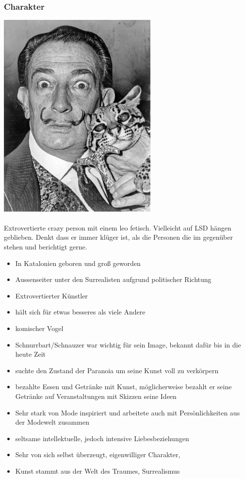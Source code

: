 \documentclass[12pt, a4paper, openany]{report}
\begin{document}
\subsubsection{Charakter}
\includegraphics[width=8cm]{Salvador-Dali.jpg}\\\\
Extrovertierte crazy person mit einem leo fetisch.  Vielleicht auf LSD hängen geblieben. Denkt dass er immer klüger ist, als die Personen die im gegenüber stehen und berichtigt gerne.

\begin{itemize}
\item In Katalonien geboren und groß geworden
\item Aussenseiter unter den Surrealisten aufgrund politischer Richtung
\item Extrovertierter Künstler
\item hält sich für etwas besseres als viele Andere
\item komischer Vogel
\item Schnurrbart/Schnauzer war wichtig für sein Image, bekannt dafür bis in die heute Zeit
\item suchte den Zustand der Paranoia um seine Kunst voll zu verkörpern
\item bezahlte Essen und Getränke mit Kunst, möglicherweise bezahlt er seine Getränke auf Veranstaltungen mit Skizzen seine Ideen
\item Sehr stark von Mode inspiriert und arbeitete auch mit Persönlichkeiten aus der Modewelt zusammen
\item seltsame intellektuelle, jedoch intensive Liebesbeziehungen 
\item Sehr von sich selbst überzeugt, eigenwilliger Charakter, 
\item Kunst stammt aus der Welt des Traumes, Surrealismus
\end{itemize}
\end{document}
